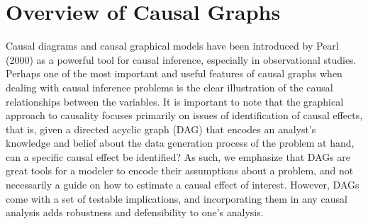 \section{Overview of Causal Graphs}

Causal diagrams and causal graphical models have been introduced by Pearl (2000) as a powerful tool for causal inference, especially in observational studies. Perhaps one of the most important and useful features of causal graphs when dealing with causal inference problems is the clear illustration of the causal relationships between the variables. It is important to note that the graphical approach to causality focuses primarily on issues of identification of causal effects, that is, given a directed acyclic graph (DAG) that encodes an analyst's knowledge and belief about the data generation process of the problem at hand, can a specific causal effect be identified? As such, we emphasize that DAGs are great tools for a modeler to encode their assumptions about a problem, and not necessarily a guide on how to estimate a causal effect of interest. However, DAGs come with a set of testable implications, and incorporating them in any causal analysis adds robustness and defensibility to one's analysis. 

\blindtext[2]